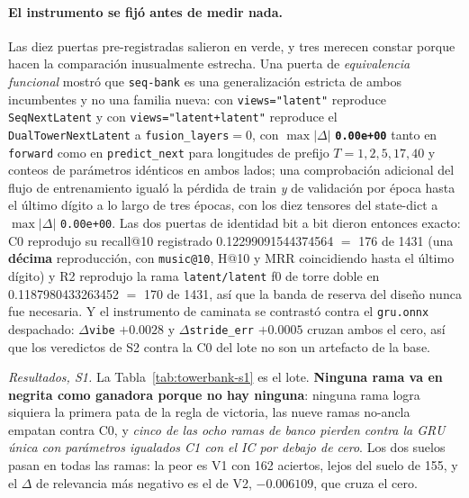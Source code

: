 \documentclass[11pt]{article}
\begin{document}
\paragraph{El instrumento se fijó antes de medir nada.} Las diez puertas
pre-registradas salieron en verde, y tres merecen constar porque hacen la
comparación inusualmente estrecha. Una puerta de \emph{equivalencia funcional}
mostró que \texttt{seq-bank} es una generalización estricta de ambos incumbentes
y no una familia nueva: con \texttt{views="latent"} reproduce
\texttt{SeqNextLatent} y con \texttt{views="latent+latent"} reproduce el
\texttt{DualTowerNextLatent} a \texttt{fusion\_layers}${}=0$, con
$\max|\Delta|$ \textbf{\texttt{0.00e+00}} tanto en \texttt{forward} como en
\texttt{predict\_next} para longitudes de prefijo $T=1,2,5,17,40$ y conteos de
parámetros idénticos en ambos lados; una comprobación adicional del flujo de
entrenamiento igualó la pérdida de train \emph{y} de validación por época hasta el
último dígito a lo largo de tres épocas, con los diez tensores del state-dict a
$\max|\Delta|$ \texttt{0.00e+00}. Las dos puertas de identidad bit a bit dieron
entonces exacto: C0 reprodujo su recall@10 registrado
\num{0.12299091544374564} $=$ \num{176} de \num{1431} (una \textbf{décima}
reproducción, con \texttt{music@10}, H@10 y MRR coincidiendo hasta el último
dígito) y R2 reprodujo la rama \texttt{latent/latent} f0 de torre doble en
\num{0.1187980433263452} $=$ \num{170} de \num{1431}, así que la banda de reserva
del diseño nunca fue necesaria. Y el instrumento de caminata se contrastó contra
el \texttt{gru.onnx} despachado: $\Delta$\texttt{vibe} $+\num{0.0028}$ y
$\Delta$\texttt{stride\_err} $+\num{0.0005}$ cruzan ambos el cero, así que los
veredictos de S2 contra la C0 del lote no son un artefacto de la base.

\emph{Resultados, S1.} La Tabla~\ref{tab:towerbank-s1} es el lote. \textbf{Ninguna
rama va en negrita como ganadora porque no hay ninguna}: ninguna rama logra
siquiera la primera pata de la regla de victoria, las nueve ramas no-ancla empatan
contra C0, y \emph{cinco de las ocho ramas de banco pierden contra la GRU única
con parámetros igualados C1 con el IC por debajo de cero}. Los dos suelos pasan en
todas las ramas: la peor es V1 con \num{162} aciertos, lejos del suelo de
\num{155}, y el $\Delta$ de relevancia más negativo es el de V2,
$-\num{0.006109}$, que cruza el cero.
\end{document}
